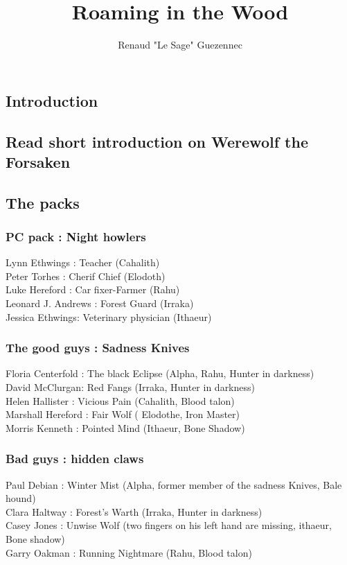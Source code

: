 \documentclass[oneside,12pt]{book}
\title{Roaming in the Wood}
\author{Renaud "Le Sage" Guezennec}
\date{}
\begin{document}
\maketitle \clearpage
\tableofcontents \clearpage

\begin{flushleft}
    \chapter{Introduction}
        \section{Read short introduction on Werewolf the Forsaken}
       
         
\section{The packs}
\subsection{PC pack : Night howlers}
Lynn Ethwings :  Teacher (Cahalith)\\
Peter Torhes : Cherif Chief (Elodoth)\\
Luke Hereford : Car fixer-Farmer (Rahu)\\
Leonard J. Andrews : Forest Guard (Irraka)\\
Jessica  Ethwings: Veterinary physician (Ithaeur)\\

\subsection{ The good guys : Sadness Knives}
Floria Centerfold : The black Eclipse (Alpha, Rahu, Hunter in darkness)\\
David McClurgan:  Red Fangs (Irraka, Hunter in darkness)\\
Helen Hallister : Vicious Pain (Cahalith, Blood talon)\\
Marshall Hereford : Fair Wolf ( Elodothe, Iron Master)\\
Morris Kenneth : Pointed Mind (Ithaeur, Bone Shadow)\\

\subsection{Bad guys : hidden claws}
Paul Debian : Winter Mist (Alpha, former member of the sadness Knives, Bale hound)\\
Clara Haltway : Forest’s Warth (Irraka, Hunter in darkness)\\
Casey Jones : Unwise Wolf (two fingers on his left hand are missing, ithaeur, Bone shadow)\\
Garry Oakman : Running Nightmare (Rahu, Blood talon)\\


\end{flushleft}
\end{document}
